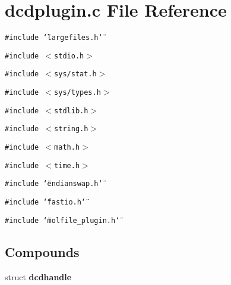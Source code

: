 \section{dcdplugin.c File Reference}
\label{dcdplugin_8c}
{\tt \#include \char`\"{}largefiles.h\char`\"{}}\par
{\tt \#include $<$stdio.h$>$}\par
{\tt \#include $<$sys/stat.h$>$}\par
{\tt \#include $<$sys/types.h$>$}\par
{\tt \#include $<$stdlib.h$>$}\par
{\tt \#include $<$string.h$>$}\par
{\tt \#include $<$math.h$>$}\par
{\tt \#include $<$time.h$>$}\par
{\tt \#include \char`\"{}endianswap.h\char`\"{}}\par
{\tt \#include \char`\"{}fastio.h\char`\"{}}\par
{\tt \#include \char`\"{}molfile\_\-plugin.h\char`\"{}}\par
\subsection*{Compounds}
\begin{CompactItemize}
\item 
struct {\bf dcdhandle}
\end{CompactItemize}
